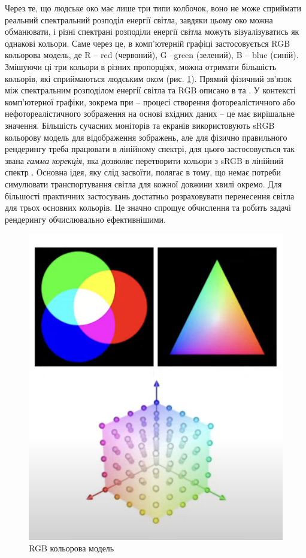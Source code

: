 Через те, що людське око має лише три типи колбочок, воно не може сприй\-ма\-ти реальний спектральний розподіл енергії світла,
завдяки цьому око мож\-на обманювати, і різні спектрані розподіли енергії світла можуть візуалізуватись як однакові кольори. Саме через це, в комп'ютерній графіці
застосовується RGB кольорова модель, де R -- red (червоний), G --green (зелений), B -- blue (синій). Змішуючи ці три кольори в різних пропорціях, можна отримати 
більшість кольорів, які сприймаються людським оком (рис. \ref{fig:RGB}). Прямий фі\-зич\-ний зв'язок між спектральним розподілом енергії світла та RGB описано в \cite{Ch1} та \cite{Ch2}. У контексті комп’ютерної графіки, зокрема при  -- процесі створення фотореалістичного або нефотореалістичного зображення на основі вхідних даних -- це має вирішальне значення.
Більшість сучасних моніторів та екранів використовують sRGB кольорову модель для відображення зображень, але для фізично правильного рендерингу треба працювати в 
лінійному спектрі, для цього застосовується так звана \textit{гамма ко\-рек\-ція}, яка дозволяє перетворити кольори з sRGB в лінійний спектр \cite{Ch5}.
Основна ідея, яку слід засвоїти, полягає в тому, що немає потреби симулювати транспортування світ\-ла для кожної довжини хвилі окремо. Для більшості прак\-тич\-них застосувань 
достатньо розраховувати перенесення світ\-ла для трьох основних кольорів. Це значно спрощує обчислення та робить задачі 
рендерингу обчислювально ефек\-тив\-ні\-ши\-ми.

\begin{figure}[h]
  \centering
  \includegraphics[scale=1]{Pictures/RGB.png}
  \caption{RGB кольорова модель}
  \label{fig:RGB}
\end{figure}

